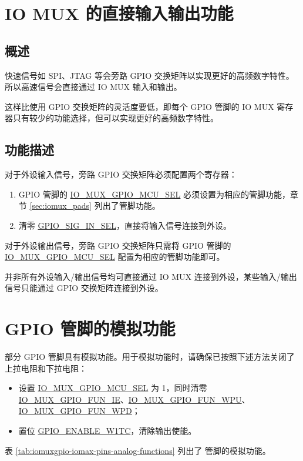 \documentclass[main\_\_CN.tex]{subfiles}
\begin{document}
\section{IO MUX 的直接输入输出功能}

\subsection{概述}

快速信号如 SPI、JTAG 等会旁路 GPIO 交换矩阵以实现更好的高频数字特性。所以高速信号会直接通过 IO MUX 输入和输出。

这样比使用 GPIO 交换矩阵的灵活度要低，即每个 GPIO 管脚的 IO MUX 寄存器只有较少的功能选择，但可以实现更好的高频数字特性。

\subsection{功能描述}

对于外设输入信号，旁路 GPIO 交换矩阵必须配置两个寄存器：

\begin{enumerate}
\item GPIO 管脚的 \hyperref[fielddesc:IOMUXGPIONMCUSEL]{IO\_MUX\_GPIO\_MCU\_SEL} 必须设置为相应的管脚功能，章节 \ref{sec:iomux_pads} 列出了管脚功能。
\item 清零 \hyperref[fielddesc:GPIOSIGNINSEL]{GPIO\_SIG\_IN\_SEL}，直接将输入信号连接到外设。
\end{enumerate}

对于外设输出信号，旁路 GPIO 交换矩阵只需将 GPIO 管脚的 \hyperref[fielddesc:IOMUXGPIONMCUSEL]{IO\_MUX\_GPIO\_MCU\_SEL} 配置为相应的管脚功能即可。

\begin{tiplisting}
并非所有外设输入/输出信号均可直接通过 IO MUX 连接到外设，某些输入/输出信号只能通过 GPIO 交换矩阵连接到外设。
\end{tiplisting}

\section{GPIO 管脚的模拟功能}

\chipname{} 部分 GPIO 管脚具有模拟功能。用于模拟功能时，请确保已按照下述方法关闭了上拉电阻和下拉电阻：

\begin{itemize}
    \item 设置 \hyperref[fielddesc:IOMUXGPIONMCUSEL]{IO\_MUX\_GPIO\_MCU\_SEL} 为 1，同时清零 \hyperref[fielddesc:IOMUXGPIONFUNIE]{IO\_MUX\_GPIO\_FUN\_IE}、\hyperref[fielddesc:IOMUXGPIONFUNIE]{IO\_MUX\_GPIO\_FUN\_WPU}、\hyperref[fielddesc:IOMUXGPIONFUNIE]{IO\_MUX\_GPIO\_FUN\_WPD}；
    \item 置位 \hyperref[fielddesc:GPIOENABLEW1TC]{GPIO\_ENABLE\_W1TC\regindex{[n]}}，清除输出使能。
\end{itemize}
表 \ref{tab:iomuxgpio-iomax-pins-analog-functions} 列出了 \chipname{} 管脚的模拟功能。
\end{document}
